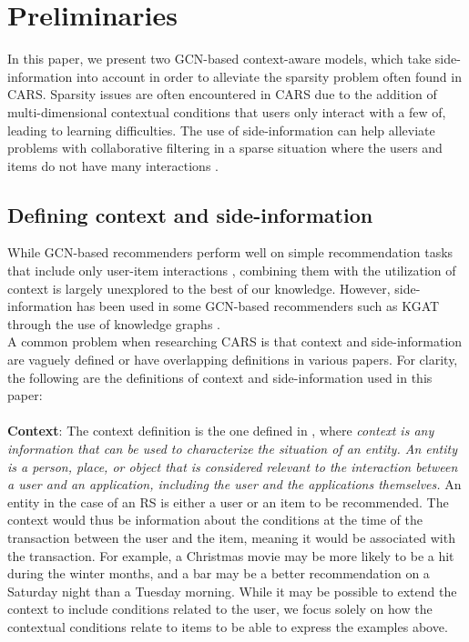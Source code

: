 \section{Preliminaries}\label{sec:preliminaries}
In this paper, we present two GCN-based context-aware models, which take side-information into account in order to alleviate the sparsity problem often found in CARS.
Sparsity issues are often encountered in CARS due to the addition of multi-dimensional contextual conditions that users only interact with a few of\cite{SparsityCARS}, leading to learning difficulties.
The use of side-information can help alleviate problems with collaborative filtering in a sparse situation where the users and items do not have many interactions \cite{KGAT}. 

\subsection{Defining context and side-information}
While GCN-based recommenders perform well on simple recommendation tasks that include only user-item interactions \cite{NGCF,LightGCN}, combining them with the utilization of context is largely unexplored to the best of our knowledge. However, side-information has been used in some GCN-based recommenders such as KGAT through the use of knowledge graphs \cite{KGAT}.\\
A common problem when researching CARS is that context and side-information are vaguely defined or have overlapping definitions in various papers.
For clarity, the following are the definitions of context and side-information used in this paper:
\\\\
\textbf{Context}:
The context definition is the one defined in \cite{contextDefinition}, where \textit{context is any information that can be used to characterize the situation of an entity. An entity is a person, place, or object that is considered relevant to the interaction between a user and an application, including the user and the applications themselves.}
An entity in the case of an RS is either a user or an item to be recommended.
The context would thus be information about the conditions at the time of the transaction between the user and the item, meaning it would be associated with the transaction.
For example, a Christmas movie may be more likely to be a hit during the winter months, and a bar may be a better recommendation on a Saturday night than a Tuesday morning.
While it may be possible to extend the context to include conditions related to the user, we focus solely on how the contextual conditions relate to items to be able to express the examples above.\\
